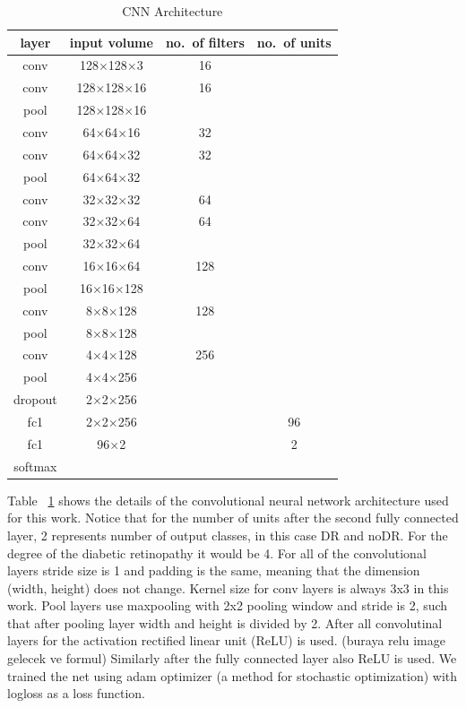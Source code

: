 \begin{table}[t]
\centering
\caption{CNN Architecture} \label{tab:cnnarc}
\begin{tabular}{|c|c|c|c|} \hline
\textbf{layer} & \textbf{input volume} & \textbf{no.\ of filters} & \textbf{no.\ of units} \\ \hline
conv & 128$\times$128$\times$3 & 16 & \\ \hline
conv & 128$\times$128$\times$16 & 16 & \\ \hline
pool & 128$\times$128$\times$16 &  & \\ \hline
conv & 64$\times$64$\times$16 & 32 & \\ \hline
conv & 64$\times$64$\times$32 & 32 & \\ \hline
pool & 64$\times$64$\times$32 &  & \\ \hline
conv & 32$\times$32$\times$32 & 64  & \\ \hline
conv & 32$\times$32$\times$64 & 64  & \\ \hline
pool & 32$\times$32$\times$64 &   & \\ \hline
conv & 16$\times$16$\times$64 & 128  & \\ \hline
pool & 16$\times$16$\times$128 &   & \\ \hline
conv & 8$\times$8$\times$128 & 128  & \\ \hline
pool & 8$\times$8$\times$128 &   & \\ \hline
conv & 4$\times$4$\times$128 & 256  & \\ \hline
pool & 4$\times$4$\times$256 &   & \\ \hline
dropout & 2$\times$2$\times$256 & & \\ \hline
fc1 & 2$\times$2$\times$256 & &96 \\ \hline
fc1 & 96$\times$2 & &2 \\ \hline
softmax & & & \\ \hline
\end{tabular}
\end{table}

Table ~\ref{tab:cnnarc} shows the details of the convolutional neural network architecture used for this work. Notice that for the number of units after the second fully connected layer, 2 represents number of output classes, in this case DR and noDR. For the degree of the diabetic retinopathy it would be 4. For all of the convolutional layers stride size is 1 and padding is the same, meaning that the dimension (width, height) does not change. Kernel size for conv layers is always 3x3 in this work. Pool layers use maxpooling with 2x2 pooling window and stride is 2, such that after pooling layer width and height is divided by 2. After all convolutinal layers for the activation rectified linear unit (ReLU) is used. (buraya relu image gelecek ve formul) Similarly after the fully connected layer also ReLU is used. 
We trained the net using adam optimizer (a method for stochastic optimization) \citep{kingma2014adam} with  logloss as a loss function. 





